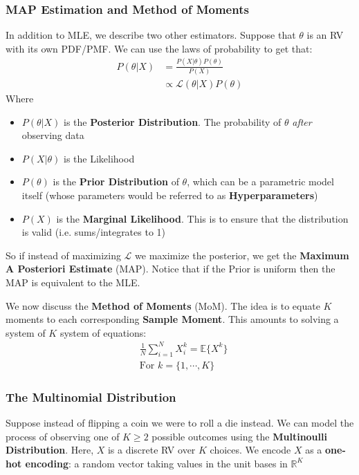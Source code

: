 \documentclass[]{article}
\theoremstyle{mattstyle}
\theoremstyle{definition}
\begin{document}
\subsubsection{MAP Estimation and Method of Moments}
In addition to MLE, we describe two other estimators. Suppose that $\theta$ is an RV with its own PDF/PMF. We can use the laws of probability to get that:
\begin{align*}
P(\theta|X) &= \frac{P(X | \theta)P(\theta)}{P(X)}\\
&\propto\mathcal{L}(\theta | X)P(\theta)
\end{align*}
Where 
\begin{itemize}
	\item $P(\theta|X)$ is the \textbf{Posterior Distribution}. The probability of $\theta$ \emph{after} observing data
	\item $P(X|\theta)$ is the Likelihood
	\item $P(\theta)$ is the \textbf{Prior Distribution} of $\theta$, which can be a parametric model itself (whose parameters would be referred to as \textbf{Hyperparameters})
	\item $P(X)$ is the \textbf{Marginal Likelihood}. This is to ensure that the distribution is valid (i.e. sums/integrates to 1)
\end{itemize}
So if instead of maximizing $\mathcal{L}$ we maximize the posterior, we get the \textbf{Maximum A Posteriori Estimate} (MAP). Notice that if the Prior is uniform then the MAP is equivalent to the MLE.

We now discuss the \textbf{Method of Moments} (MoM). The idea is to equate $K$ moments to each corresponding \textbf{Sample Moment}. This amounts to solving a system of $K$ system of equations:
\begin{align*}
&\frac{1}{N}\sum_{i=1}^N X_i^k = \mathbb{E}\{X^k\}\\
&\text{For $k=\{1, \cdots, K\}$}
\end{align*}

\newpage

\subsubsection{The Multinomial Distribution}

Suppose instead of flipping a coin we were to roll a die instead. We can model the process of observing one of $K \ge 2$ possible outcomes using the \textbf{Multinoulli Distribution}. Here, $X$ is a discrete RV over $K$ choices. We encode $X$ as a \textbf{one-hot encoding}: a random vector taking values in the unit bases in $\mathbb{R}^{K}$ 
\end{document}
